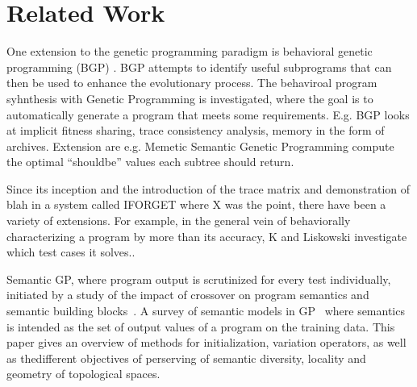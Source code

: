 \section{Related Work}
\label{sec:related-work}


One extension to the genetic programming paradigm is behavioral
genetic programming (BGP) \cite{krawiecGECCO2014,KrawiecBPS2016}.  BGP attempts to identify
useful subprograms that can then be used to enhance the evolutionary
process. The behaviroal program syhnthesis with Genetic
Programming\cite{krawiec2016behavioral} is investigated, where the
goal is to automatically generate a program that meets some
requirements. E.g. BGP looks at implicit fitness
sharing\cite{mckay2000fitness}, trace consistency analysis, memory in
the form of archives\cite{haynes1997line}. Extension are e.g. Memetic Semantic Genetic
Programming\cite{Ffrancon:2015:MSG:2739480.2754697} compute the
optimal ``shouldbe'' values each subtree should return.


  Since its inception\cite{KrawiecSwan} and the introduction of the trace matrix and demonstration of blah in a system called IFORGET where X was the point, there have been a variety of extensions. For example,  in the general vein of behaviorally characterizing a program by more than its accuracy, K and Liskowski investigate which test cases it solves..


Semantic GP, where program output is scrutinized for every test
individually, initiated by a study of the impact of crossover on
program semantics and semantic building
blocks~\cite{mcphee2008semantic}. A survey of semantic models in
GP~\cite{vanneschi2014survey} where semantics is intended as the set
of output values of a program on the training data. This paper gives
an overview of methods for initialization, variation operators, as
well as thedifferent objectives of perserving of semantic diversity,
locality and geometry of topological spaces.

